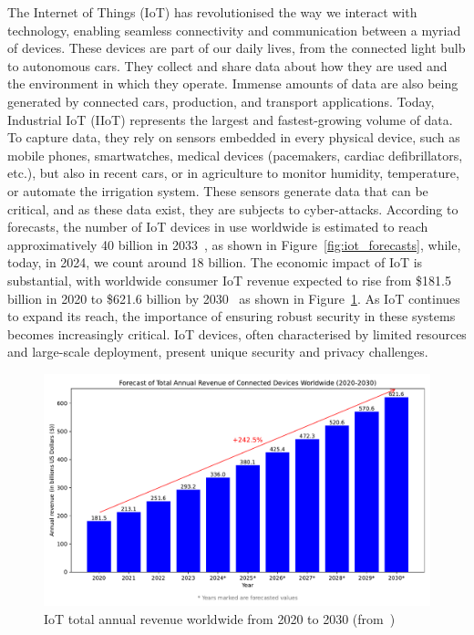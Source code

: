 The Internet of Things (IoT) has revolutionised the way we interact with technology, enabling seamless connectivity and communication between a myriad of devices. These devices are part of our daily lives, from the connected light bulb to autonomous cars. They collect and share data about how they are used and the environment in which they operate. Immense amounts of data are also being generated by connected cars, production, and transport applications. Today, Industrial IoT (IIoT) represents the largest and fastest-growing volume of data.
To capture data, they rely on sensors embedded in every physical device, such as mobile phones, smartwatches, medical devices (pacemakers, cardiac defibrillators, etc.), but also in recent cars, or in agriculture to monitor humidity, temperature, or automate the irrigation system. These sensors generate data that can be critical, and as these data exist, they are subjects to cyber-attacks.
According to forecasts, the number of IoT devices in use worldwide is estimated to reach approximatively 40 billion in 2033~\cite{statista_iot}, as shown in Figure~\ref{fig:iot_forecasts}, while, today, in 2024, we count around 18 billion. The economic impact of IoT is substantial, with worldwide consumer IoT revenue expected to rise from \$181.5 billion in 2020 to \$621.6 billion by 2030~\cite{statista_iot_revenu} as shown in Figure~\ref{fig:iot_revenue}.
As IoT continues to expand its reach, the importance of ensuring robust security in these systems becomes increasingly critical. IoT devices, often characterised by limited resources and large-scale deployment, present unique security and privacy challenges.

\begin{figure}[ht]
    \centering
    \includegraphics[width=\linewidth]{c1_intro/img/iot_revenue.pdf}
    \caption{IoT total annual revenue worldwide from 2020 to 2030 (from~\cite{statista_iot_revenu})}
    \label{fig:iot_revenue}
\end{figure}


